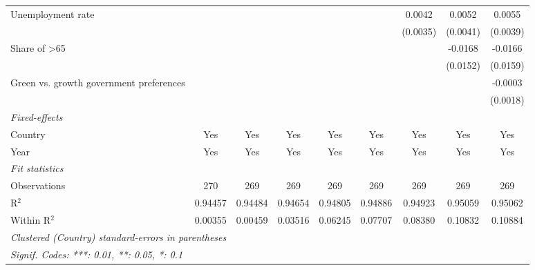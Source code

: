 \begin{table}[htbp]
\begin{tabular}{lcccccccc}
      Unemployment rate                                                        &          &          &          &          &          & 0.0042   & 0.0052   & 0.0055\\   
                                                                               &          &          &          &          &          & (0.0035) & (0.0041) & (0.0039)\\   
      Share of >65                                                             &          &          &          &          &          &          & -0.0168  & -0.0166\\   
                                                                               &          &          &          &          &          &          & (0.0152) & (0.0159)\\   
      Green vs. growth government preferences                                  &          &          &          &          &          &          &          & -0.0003\\   
                                                                               &          &          &          &          &          &          &          & (0.0018)\\   
      \midrule
      \emph{Fixed-effects}\\
      Country                                                                  & Yes      & Yes      & Yes      & Yes      & Yes      & Yes      & Yes      & Yes\\  
      Year                                                                     & Yes      & Yes      & Yes      & Yes      & Yes      & Yes      & Yes      & Yes\\  
      \midrule
      \emph{Fit statistics}\\
      Observations                                                             & 270      & 269      & 269      & 269      & 269      & 269      & 269      & 269\\  
      R$^2$                                                                    & 0.94457  & 0.94484  & 0.94654  & 0.94805  & 0.94886  & 0.94923  & 0.95059  & 0.95062\\  
      Within R$^2$                                                             & 0.00355  & 0.00459  & 0.03516  & 0.06245  & 0.07707  & 0.08380  & 0.10832  & 0.10884\\  
      \midrule \midrule
      \multicolumn{9}{l}{\emph{Clustered (Country) standard-errors in parentheses}}\\
      \multicolumn{9}{l}{\emph{Signif. Codes: ***: 0.01, **: 0.05, *: 0.1}}\\
   \end{tabular}
\end{table}


